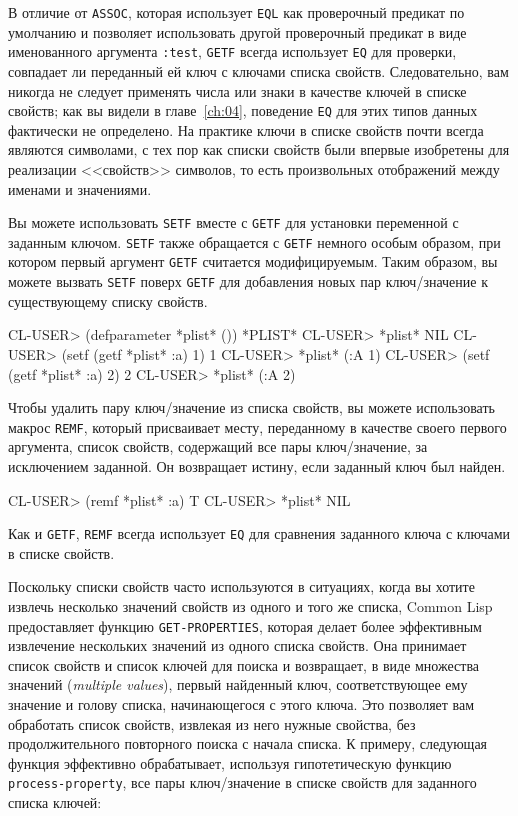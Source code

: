 В отличие от \lstinline{ASSOC}, которая использует \lstinline{EQL} как проверочный предикат по
умолчанию и позволяет использовать другой проверочный предикат в виде именованного
аргумента \lstinline{:test}, \lstinline{GETF} всегда использует \lstinline{EQ} для проверки, совпадает ли
переданный ей ключ с ключами списка свойств. Следовательно, вам никогда не следует
применять числа или знаки в качестве ключей в списке свойств; как вы видели в
главе~\ref{ch:04}, поведение \lstinline{EQ} для этих типов данных фактически не определено. На
практике ключи в списке свойств почти всегда являются символами, с тех пор как списки
свойств были впервые изобретены для реализации <<свойств>> символов, то есть произвольных
отображений между именами и значениями.

Вы можете использовать \lstinline{SETF} вместе с \lstinline{GETF} для установки переменной с
заданным ключом. \lstinline{SETF} также обращается с \lstinline{GETF} немного особым образом, при
котором первый аргумент \lstinline{GETF} считается модифицируемым. Таким образом, вы можете
вызвать \lstinline{SETF} поверх \lstinline{GETF} для добавления новых пар ключ/значение к
существующему списку свойств.
  
\begin{myverb}
  CL-USER> (defparameter *plist* ())
  *PLIST*
  CL-USER> *plist*
  NIL
  CL-USER> (setf (getf *plist* :a) 1)
  1
  CL-USER> *plist*
  (:A 1)
  CL-USER> (setf (getf *plist* :a) 2)
  2
  CL-USER> *plist*
  (:A 2)
\end{myverb}

Чтобы удалить пару ключ/значение из списка свойств, вы можете использовать макрос
\lstinline{REMF}, который присваивает месту, переданному в качестве своего первого аргумента,
список свойств, содержащий все пары ключ/значение, за исключением заданной. Он возвращает
истину, если заданный ключ был найден.
  
\begin{myverb}
  CL-USER> (remf *plist* :a)
  T
  CL-USER> *plist*
  NIL
\end{myverb}

Как и \lstinline{GETF}, \lstinline{REMF} всегда использует \lstinline{EQ} для сравнения заданного ключа с
ключами в списке свойств.

Поскольку списки свойств часто используются в ситуациях, когда вы хотите извлечь несколько
значений свойств из одного и того же списка, Common Lisp предоставляет функцию
\lstinline{GET-PROPERTIES}, которая делает более эффективным извлечение нескольких значений из
одного списка свойств. Она принимает список свойств и список ключей для поиска и
возвращает, в виде множества значений (\textit{multiple values}), первый найденный ключ,
соответствующее ему значение и голову списка, начинающегося с этого ключа. Это позволяет
вам обработать список свойств, извлекая из него нужные свойства, без продолжительного
повторного поиска с начала списка.  К примеру, следующая функция эффективно обрабатывает,
используя гипотетическую функцию \lstinline{process-property}, все пары ключ/значение в списке
свойств для заданного списка ключей:

